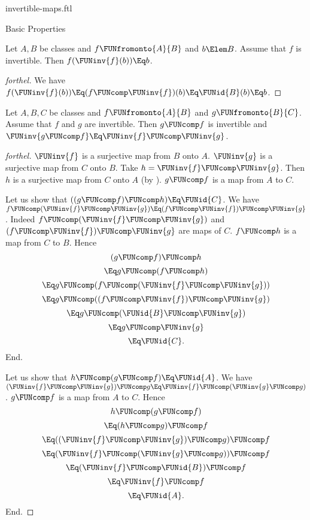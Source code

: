 \documentclass{stex}
\begin{document}
\begin{smodule}{invertible-maps.ftl}
\begin{sfragment}{Basic Properties}
  \begin{proposition}[forthel,id=FOUNDATIONS_09_6093864386712935]
    Let $A, B$ be classes and $f \FUNfromonto{A}{B}$ and $b \Elem B$.
    Assume that $f$ is invertible.
    Then $f(\FUNinv{f}(b)) \Eq b$.
  \end{proposition}
  \begin{proof}[forthel]
    We have
    $f(\FUNinv{f}(b))
      \Eq (f \FUNcomp \FUNinv{f})(b)
      \Eq \FUNid{B}(b)
      \Eq b$.
  \end{proof}

  \begin{proposition}[forthel,id=FOUNDATIONS_09_7619151963095040]
    Let $A, B, C$ be classes and $f \FUNfromonto{A}{B}$ and $g \FUNfromonto{B}{C}$.
    Assume that $f$ and $g$ are invertible.
    Then $g \FUNcomp f$ is invertible and $\FUNinv{g \FUNcomp f} \Eq \FUNinv{f} \FUNcomp \FUNinv{g}$.
  \end{proposition}
  \begin{proof}[forthel]
    $\FUNinv{f}$ is a surjective map from $B$ onto $A$.
    $\FUNinv{g}$ is a surjective map from $C$ onto $B$.
    Take $h = \FUNinv{f} \FUNcomp \FUNinv{g}$.
    Then $h$ is a surjective map from $C$ onto $A$ (by ).
    $g \FUNcomp f$ is a map from $A$ to $C$.

    Let us show that $((g \FUNcomp f) \FUNcomp h) \Eq \FUNid{C}$.
      We have $f \FUNcomp (\FUNinv{f} \FUNcomp \FUNinv{g}) \Eq (f \FUNcomp \FUNinv{f}) \FUNcomp \FUNinv{g}$.
      Indeed $f \FUNcomp (\FUNinv{f} \FUNcomp \FUNinv{g})$ and $(f \FUNcomp \FUNinv{f}) \FUNcomp \FUNinv{g}$ are maps of $C$.
      $f \FUNcomp h$ is a map from $C$ to $B$.
      Hence
      \[  (g \FUNcomp f) \FUNcomp h                           \]
      \[    \Eq g \FUNcomp (f \FUNcomp h)                       \]
      \[    \Eq g \FUNcomp (f \FUNcomp (\FUNinv{f} \FUNcomp \FUNinv{g}))   \]
      \[    \Eq g \FUNcomp ((f \FUNcomp \FUNinv{f}) \FUNcomp \FUNinv{g})   \]
      \[    \Eq g \FUNcomp (\FUNid{B} \FUNcomp \FUNinv{g})            \]
      \[    \Eq g \FUNcomp \FUNinv{g}                            \]
      \[    \Eq \FUNid{C}.                                  \]
    End.

    Let us show that $h \FUNcomp (g \FUNcomp f) \Eq \FUNid{A}$.
      We have $(\FUNinv{f} \FUNcomp \FUNinv{g}) \FUNcomp g \Eq \FUNinv{f} \FUNcomp (\FUNinv{g} \FUNcomp g)$.
      $g \FUNcomp f$ is a map from $A$ to $C$.
      Hence
      \[  h \FUNcomp (g \FUNcomp f)                           \]
      \[    \Eq (h \FUNcomp g) \FUNcomp f                       \]
      \[    \Eq ((\FUNinv{f} \FUNcomp \FUNinv{g}) \FUNcomp g) \FUNcomp f   \]
      \[    \Eq (\FUNinv{f} \FUNcomp (\FUNinv{g} \FUNcomp g)) \FUNcomp f   \]
      \[    \Eq (\FUNinv{f} \FUNcomp \FUNid{B}) \FUNcomp f            \]
      \[    \Eq \FUNinv{f} \FUNcomp f                            \]
      \[    \Eq \FUNid{A}.                                  \]
    End.


\end{proof}
\end{sfragment}
\end{smodule}
\end{document}
